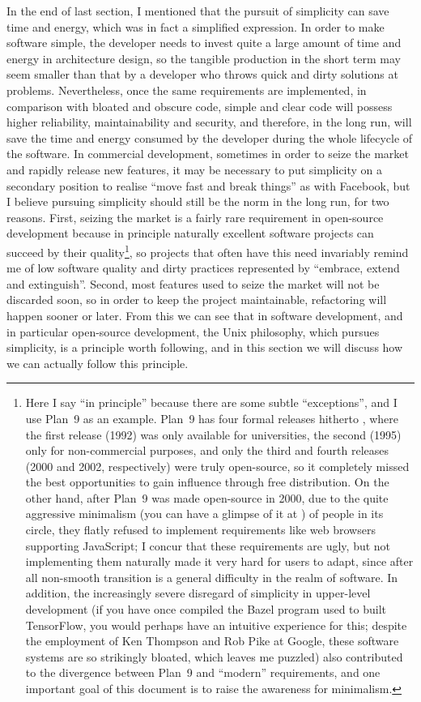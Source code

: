 In the end of last section, I mentioned that the pursuit of simplicity can
save time and energy, which was in fact a simplified expression.  In order to
make software simple, the developer needs to invest quite a large amount of time
and energy in architecture design, so the tangible production in the short term
may seem smaller than that by a developer who throws quick and dirty solutions
at problems.  Nevertheless, once the same requirements are implemented, in
comparison with bloated and obscure code, simple and clear code will possess
higher reliability, maintainability and security, and therefore, in the long
run, will save the time and energy consumed by the developer during the whole
lifecycle of the software.  In commercial development, sometimes in order to
seize the market and rapidly release new features, it may be necessary to put
simplicity on a secondary position to realise ``move fast and break things''
as with Facebook, but I believe pursuing simplicity should still be the norm
in the long run, for two reasons.  First, seizing the market is a fairly rare
requirement in open-source development because in principle naturally excellent
software projects can succeed by their quality\footnote{\label{fn:plan9}Here
I say ``in principle'' because there are some subtle ``exceptions'', and
I use Plan~9 as an example.  Plan~9 has four formal releases hitherto%
, where the first release (1992) was only available for
universities, the second (1995) only for non-commercial purposes, and only the
third and fourth releases (2000 and 2002, respectively) were truly open-source,
so it completely missed the best opportunities to gain influence through free
distribution.  On the other hand, after Plan~9 was made open-source in 2000,
due to the quite aggressive minimalism (you can have a glimpse of it at
\parencite{catv:hsoft}) of people in its circle, they flatly refused to
implement requirements like web browsers supporting JavaScript; I concur
that these requirements are ugly, but not implementing them naturally made
it very hard for users to adapt, since after all non-smooth transition is
a general difficulty in the realm of software.  In addition, the increasingly
severe disregard of simplicity in upper-level development (if you have once
compiled the Bazel program used to built TensorFlow, you would perhaps have an
intuitive experience for this; despite the employment of Ken Thompson and Rob
Pike \etal{} at Google, these software systems are so strikingly bloated, which
leaves me puzzled) also contributed to the divergence between Plan~9 and
``modern'' requirements, and one important goal of this document is to raise
the awareness for minimalism.}, so projects that often have this need invariably
remind me of low software quality and dirty practices represented by ``embrace,
extend and extinguish''.  Second, most features used to seize the market
will not be discarded soon, so in order to keep the project maintainable,
refactoring will happen sooner or later.  From this we can see that in software
development, and in particular open-source development, the Unix philosophy,
which pursues simplicity, is a principle worth following, and in this
section we will discuss how we can actually follow this principle.


